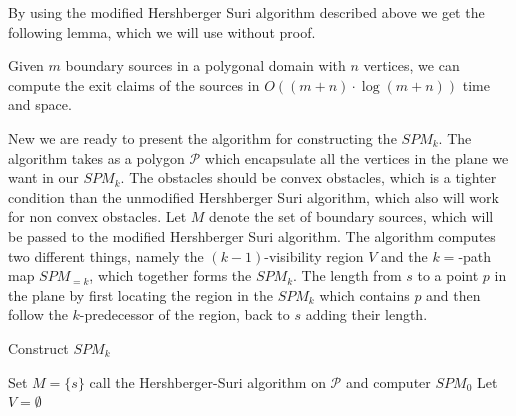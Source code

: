 By using the modified Hershberger Suri algorithm described above we get the following lemma, which we will use without proof.

\begin{Lemma}
Given $m$ boundary sources in a polygonal domain with $n$ vertices, we can compute the exit claims of the sources in $O((m + n) \cdot \log
(m + n))$ time and space.
\end{Lemma}

New we are ready to present the algorithm for constructing the $SPM_k$. The algorithm takes as a polygon $\mathcal{P}$ which encapsulate all 
the vertices in the plane we want in our $SPM_k$. The obstacles should be convex obstacles, which is a tighter condition than the unmodified 
Hershberger Suri algorithm, which also will work for non convex obstacles. Let $M$ denote the set of boundary sources, which will be 
passed to the modified Hershberger Suri algorithm. The algorithm computes two different things, namely the $(k-1)$-visibility region $V$ 
and the $k=$-path map $SPM_{=k}$, which together forms the $SPM_k$. The length from $s$ to a point $p$ in the plane by first locating the 
region in the $SPM_k$ which contains $p$ and then follow the $k$-predecessor of the region, back to $s$  adding their length.

\begin{algorithm}[H]
	\caption{Construct $SPM_k$} \label{algorithm:constructspmk}
	\begin{algorithmic}[1]
	    \State Set $M=\{s\}$
	    \State call the Hershberger-Suri algorithm on $\mathcal{P}$ and computer $SPM_0$
	    \State Let $V = \emptyset$
		    \State {}
            \State {}
            \Else 
            \EndIf
            \State {}
        \EndFor
        \State {}
	\end{algorithmic} 
\end{algorithm}

